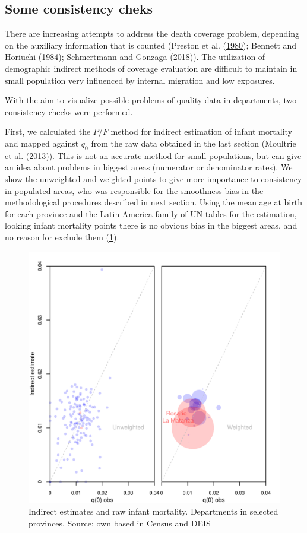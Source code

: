 \documentclass[12pt,]{article}
\begin{document}
\hypertarget{some-consistency-cheks}{%
\subsection{\texorpdfstring{\textbf{Some consistency
cheks}}{Some consistency cheks}}\label{some-consistency-cheks}}

There are increasing attempts to address the death coverage problem,
depending on the auxiliary information that is counted (Preston et al.
(\protect\hyperlink{ref-Preston1980}{1980}); Bennett and Horiuchi
(\protect\hyperlink{ref-Bennett_Horiuchi_1984}{1984}); Schmertmann and
Gonzaga (\protect\hyperlink{ref-Schmertmann2018}{2018})). The
utilization of demographic indirect methods of coverage evaluation are
difficult to maintain in small population very influenced by internal
migration and low exposures.

With the aim to visualize possible problems of quality data in
departments, two consistency checks were performed.

First, we calculated the \(P/F\) method for indirect estimation of
infant mortality and mapped against \(q_0\) from the raw data obtained
in the last section (Moultrie et al.
(\protect\hyperlink{ref-Moultrie}{2013})). This is not an accurate
method for small populations, but can give an idea about problems in
biggest areas (numerator or denominator rates). We show the unweighted
and weighted points to give more importance to consistency in populated
areas, who was responsible for the smoothness bias in the methodological
procedures described in next section. Using the mean age at birth for
each province and the Latin America family of UN tables for the
estimation, looking infant mortality points there is no obvious bias in
the biggest areas, and no reason for exclude them (\ref{fig:PF}).

\begin{figure}

{\centering \includegraphics[width=0.7\linewidth]{analysis/plots/ChekPF} 

}

\caption{Indirect estimates and raw infant mortality. Departments in selected provinces. Source: own based in Census and DEIS}\label{fig:PF}
\end{figure}
\end{document}
